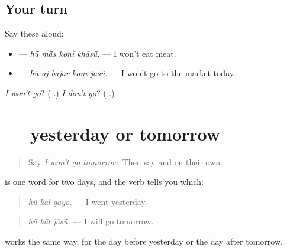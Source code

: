 \subsection*{Your turn}
Say these aloud:

\begin{itemize}
\raggedright
  \item \textbf{   } — \emph{hū̃ mā̃s konī khāsū̃.} — I won't eat meat.
  \item \textbf{    } — \emph{hū̃ āj bājār konī jāsū̃.} — I won't go to the market today.
\end{itemize}

\begin{tcolorbox}[breakable,colback=teal!4,colframe=teal!35!black,title={Before you move on}]
\emph{I won't go}? (\textbf{ }.) \emph{I don't go}? (\textbf{ }.)
\end{tcolorbox}
\section[\texorpdfstring{\mw{काल} (kāl)}{काल (kāl)}]{ — yesterday or tomorrow}

\label{lesson:MW-C162-kal}



\begin{quote}
Say \emph{I won't go tomorrow}. Then say \textbf{} and \textbf{} on their own.
\end{quote}

\begin{grammarlens}[title={Grammar Lens: the verb decides}]
\textbf{} is one word for two days, and the verb tells you which:

\begin{quote}
\textbf{  }
\end{quote}

\begin{quote}
\emph{hū̃ kāl gayo.} — I went yesterday.
\end{quote}

\begin{quote}
\textbf{  }
\end{quote}

\begin{quote}
\emph{hū̃ kāl jāsū̃.} — I will go tomorrow.
\end{quote}

\textbf{} works the same way, for the day before yesterday or the day after tomorrow.
\end{grammarlens}

